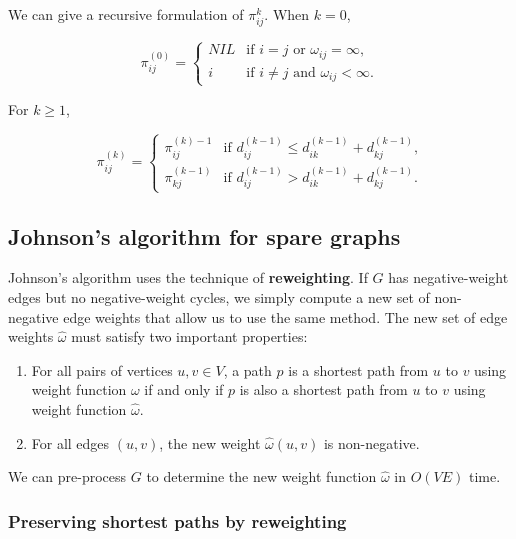 \documentclass[12pt]{article}
\begin{document}
We can give a recursive formulation of $\pi_{ij}^{k}$. When $k = 0$,

\begin{equation*}
  \pi_{ij}^{(0)} =
  \begin{cases}
    NIL & \text{if $i=j$ or $\omega_{ij} = \infty$,} \\
    i   & \text{if $i \neq j$ and $\omega_{ij} < \infty$.}
  \end{cases}
\end{equation*}

For $k \ge 1$,

\begin{equation*}
  \pi_{ij}^{(k)} =
  \begin{cases}
    \pi_{ij}^{(k)-1} & \text{if $d_{ij}^{(k-1)} \le d_{ik}^{(k-1)} + d_{kj}^{(k-1)}$,} \\
    \pi_{kj}^{(k-1)} & \text{if $d_{ij}^{(k-1)} > d_{ik}^{(k-1)} + d_{kj}^{(k-1)}$.}
  \end{cases}
\end{equation*}

\subsection{Johnson's algorithm for spare graphs}

Johnson's algorithm uses the technique of \textbf{reweighting}. If $G$ has negative-weight edges but no negative-weight cycles, we simply compute a new set of non-negative edge weights that allow us to use the same method. The new set of edge weights $\hat{\omega}$ must satisfy two important properties:

\begin{enumerate}
  \item For all pairs of vertices $u ,v \in V$, a path $p$ is a shortest path from $u$ to $v$ using weight function $\omega$ if and only if $p$ is also a shortest path from $u$ to $v$ using weight function $\hat{\omega}$.
  \item For all edges $(u,v)$, the new weight $\hat{\omega}(u,v)$ is non-negative.
\end{enumerate}

We can pre-process $G$ to determine the new weight function $\hat{\omega}$  in $O(VE)$ time.

\subsubsection*{Preserving shortest paths by reweighting}
\end{document}
